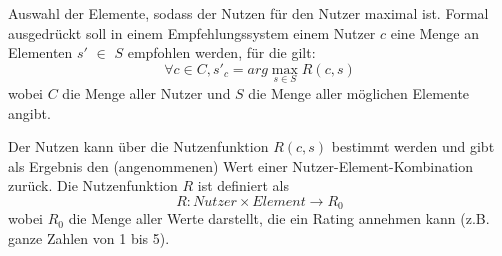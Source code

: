 Auswahl der Elemente, sodass der Nutzen für den Nutzer maximal ist.
Formal ausgedrückt soll in einem Empfehlungssystem einem Nutzer $c$ eine Menge an Elementen $s'$ $\in$ $S$ empfohlen werden, für die gilt:
\begin{equation} %
    \forall c\in C,  s'_c = arg\max_{s \in S} R(c,s)
\end{equation}
wobei $C$ die Menge aller Nutzer und $S$ die Menge aller möglichen Elemente angibt.

Der Nutzen kann über die Nutzenfunktion $R(c,s)$ bestimmt werden und gibt als Ergebnis den (angenommenen) Wert einer Nutzer-Element-Kombination zurück.
Die Nutzenfunktion $R$ ist definiert als %
\begin{equation}
    R: Nutzer \times Element \rightarrow R_{0}
\end{equation}
wobei $R_{0}$ die Menge aller Werte darstellt, die ein Rating annehmen kann (z.B. ganze Zahlen von  1 bis 5). %


